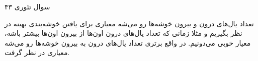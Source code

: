 سوال تئوری ۴۳

تعداد یال‌های درون و بیرون خوشه‌ها رو می‌شه معیاری برای یافتن خوشه‌بندی بهینه در نظر بگیریم و مثلا زمانی که تعداد یال‌های درون اون‌ها از بیرون اون‌ها بیشتر باشه، معیار خوبی می‌دونیم. در واقع برتری تعداد یال‌های درون به بیرون خوشه‌ها رو می‌شه معیاری در نظر گرفت.